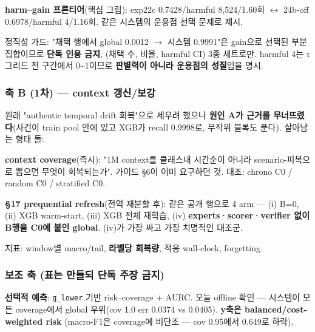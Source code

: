 \par\noindent \textbullet\enspace \textbf{harm–gain 프론티어}(핵심 그림): exp22c 0.7428/\allowbreak{}harmful 8,524/\allowbreak{}1.60회  \ensuremath{\leftrightarrow}  24b-off 0.6978/\allowbreak{}harmful 4/\allowbreak{}1.16회. 같은 시스템의 운용점 선택 문제로 제시.


\par\noindent \textbullet\enspace 정직성 가드: "채택 행에서 global 0.0012  \ensuremath{\rightarrow}  시스템 0.9991"은 gain으로 선택된 부분집합이므로 \textbf{단독 인용 금지}, (채택 수, 비율, harmful CI) 3종 세트로만. harmful 4는 τ 그리드 전 구간에서 0\textasciitilde{}1이므로 \textbf{판별력이 아니라 운용점의 성질}임을 명시.


\subsubsection{축 B (1차) — context 갱신/\allowbreak{}보강}
원래 "authentic temporal drift 회복"으로 세우려 했으나 \textbf{원인 A가 근거를 무너뜨렸다}(사건이 train pool 안에 있고 XGB가 recall 0.9998로, 무작위 블록도 푼다). 살아남는 형태 둘:

\par\noindent \textbullet\enspace \textbf{context coverage}(즉시): "1M context를 클래스내 시간순이 아니라 scenario-피복으로 뽑으면 무엇이 회복되는가". 가이드 §6이 이미 요구하던 것. 대조: chrono C0 /\allowbreak{} random C0 /\allowbreak{} stratified C0.


\par\noindent \textbullet\enspace \textbf{§17 prequential refresh}(전역 재분할 후): 같은 공개 행으로 4 arm — (i) B=\allowbreak{}0, (ii) XGB warm-start, (iii) XGB 전체 재학습, (iv) \textbf{experts·scorer·verifier 없이 B행을 C0에 붙인 global}. (iv)가 가장 싸고 가장 치명적인 대조군.


\par\noindent \textbullet\enspace 지표: window별 macro/\allowbreak{}tail, \textbf{라벨당 회복량}, 적응 wall-clock, forgetting.


\subsubsection{보조 축 (표는 만들되 단독 주장 금지)}
\par\noindent \textbullet\enspace \textbf{선택적 예측}: \texttt{g\_\allowbreak{}\allowbreak{}lower} 기반 risk–coverage +\allowbreak{} AURC. 오늘 offline 확인 — 시스템이 모든 coverage에서 global 우위(cov 1.0 err 0.0374 vs 0.0405). \textbf{y축은 balanced/\allowbreak{}cost-weighted risk} (macro-F1은 coverage에 비단조 — cov 0.95에서 0.649로 하락).



